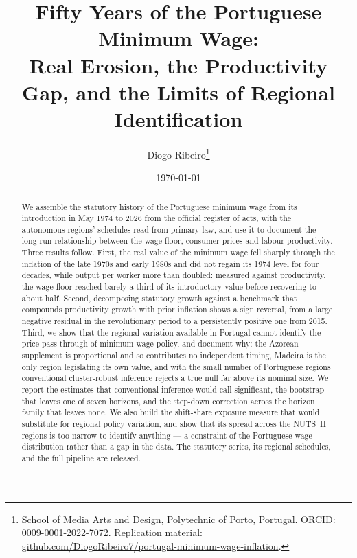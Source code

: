 \documentclass[11pt]{article}
\title{Fifty Years of the Portuguese Minimum Wage:\\
Real Erosion, the Productivity Gap, and the Limits of Regional Identification}
\author{%
  Diogo Ribeiro\thanks{%
    School of Media Arts and Design, Polytechnic of Porto, Portugal.
    ORCID: \href{https://orcid.org/0009-0001-2022-7072}{0009-0001-2022-7072}.
    Replication material:
    \href{https://github.com/DiogoRibeiro7/portugal-minimum-wage-inflation}%
    {github.com/DiogoRibeiro7/portugal-minimum-wage-inflation}.%
  }%
}
\date{\today}
\begin{document}
\maketitle

\begin{abstract}
We assemble the statutory history of the Portuguese minimum wage from its
introduction in May 1974 to 2026 from the official register of acts, with the
autonomous regions' schedules read from primary law, and use it to document the
long-run relationship between the wage floor, consumer prices and labour
productivity. Three results follow. First, the real value of the minimum
wage fell sharply through the inflation of the late 1970s and early 1980s and
did not regain its 1974 level for four decades, while output per worker more
than doubled: measured against productivity, the wage floor reached barely a
third of its introductory value before recovering to about half. Second,
decomposing statutory growth against a benchmark that compounds productivity
growth with prior inflation shows a sign reversal, from a large negative
residual in the revolutionary period to a persistently positive one from 2015.
Third, we show that the regional variation available in Portugal cannot
identify the price pass-through of minimum-wage policy, and document why: the
Azorean supplement is proportional and so contributes no independent timing,
Madeira is the only region legislating its own value, and with the small number
of Portuguese regions conventional cluster-robust inference rejects a true null
far above its nominal size. We report the estimates that conventional inference
would call significant, the bootstrap that leaves one of seven horizons, and the
step-down correction across the horizon family that leaves none. We also
build the shift-share exposure measure that would substitute for regional
policy variation, and show that its spread across the \ExposureRegions{}
NUTS~II regions is too narrow to identify anything --- a constraint of the
Portuguese wage distribution rather than a gap in the data. The
statutory series, its regional schedules, and the full pipeline are released.
\end{abstract}












\end{document}
